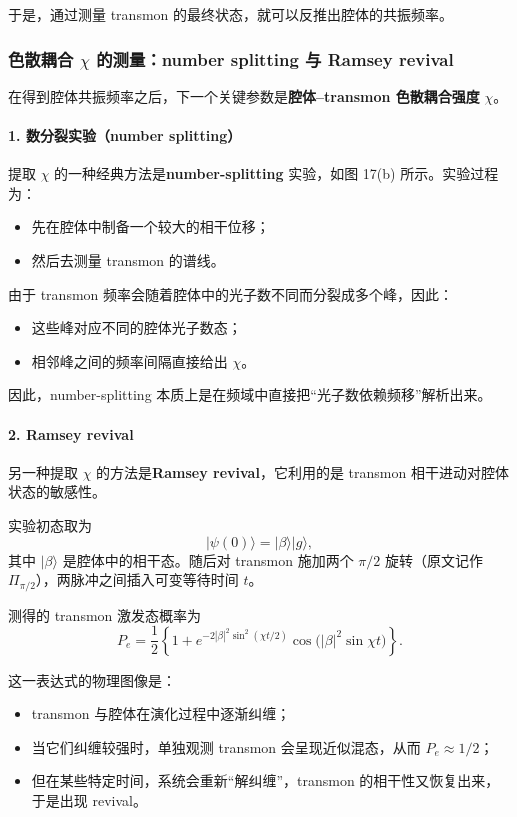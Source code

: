 \documentclass[12pt,a4paper,oneside]{ctexbook}
\begin{document}
于是，通过测量 transmon 的最终状态，就可以反推出腔体的共振频率。

\subsubsection{色散耦合 \(\chi\) 的测量：number splitting 与 Ramsey revival}

在得到腔体共振频率之后，下一个关键参数是\textbf{腔体--transmon 色散耦合强度} \(\chi\)。

\paragraph{1. 数分裂实验（number splitting）}
提取 \(\chi\) 的一种经典方法是\textbf{number-splitting} 实验，如图 17(b) 所示。实验过程为：
\begin{itemize}
    \item 先在腔体中制备一个较大的相干位移；
    \item 然后去测量 transmon 的谱线。
\end{itemize}

由于 transmon 频率会随着腔体中的光子数不同而分裂成多个峰，因此：
\begin{itemize}
    \item 这些峰对应不同的腔体光子数态；
    \item 相邻峰之间的频率间隔直接给出 \(\chi\)。
\end{itemize}

因此，number-splitting 本质上是在频域中直接把“光子数依赖频移”解析出来。

\paragraph{2. Ramsey revival}
另一种提取 \(\chi\) 的方法是\textbf{Ramsey revival}，它利用的是 transmon 相干进动对腔体状态的敏感性。

实验初态取为
\[
|\psi(0)\rangle = |\beta\rangle|g\rangle,
\]
其中 \(|\beta\rangle\) 是腔体中的相干态。随后对 transmon 施加两个 \(\pi/2\) 旋转（原文记作 \(\Pi_{\pi/2}\)），两脉冲之间插入可变等待时间 \(t\)。

测得的 transmon 激发态概率为
\begin{equation}
P_e
=
\frac{1}{2}
\left\{
1+
e^{-2|\beta|^2\sin^2(\chi t/2)}
\cos\!\bigl(|\beta|^2\sin \chi t\bigr)
\right\}.
\tag{87}
\end{equation}

这一表达式的物理图像是：
\begin{itemize}
    \item transmon 与腔体在演化过程中逐渐纠缠；
    \item 当它们纠缠较强时，单独观测 transmon 会呈现近似混态，从而 \(P_e\approx 1/2\)；
    \item 但在某些特定时间，系统会重新“解纠缠”，transmon 的相干性又恢复出来，于是出现 revival。
\end{itemize}
\end{document}
